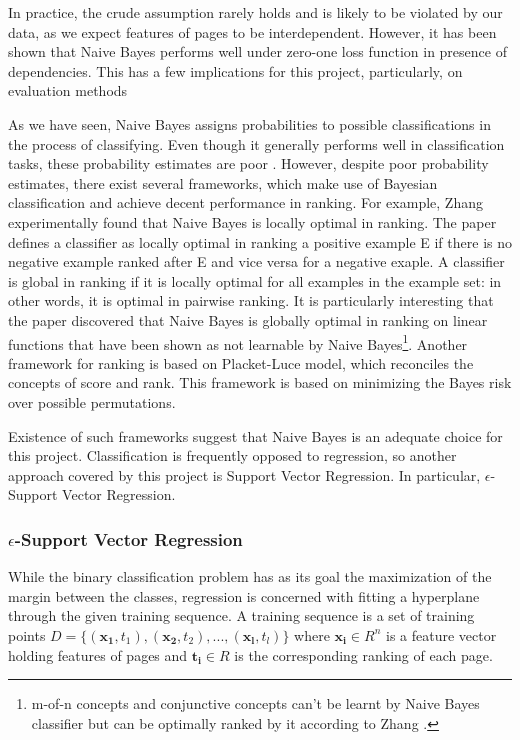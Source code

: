 \documentclass[12pt,twoside,notitlepage]{report}
\begin{document}
In practice, the crude assumption rarely  holds and is likely to
be violated by our data, as we expect features of pages to be interdependent.
However, it has been shown that Naive Bayes performs well under zero-one loss
function in presence of dependencies\cite{OPTIM}. This has a few
implications for this project, particularly, on evaluation methods 

As we have seen, Naive Bayes assigns probabilities to possible classifications
in the process of classifying. Even though it generally performs well in
classification tasks, these probability estimates are poor \cite{domingos96}.
However, despite poor probability estimates, there exist several frameworks,
which make use of Bayesian classification and achieve decent performance in
ranking. For example, Zhang \cite{zhang04} experimentally found that Naive
Bayes is locally optimal in ranking. The paper defines a classifier as locally
optimal in ranking a positive example E if there is no negative example ranked
after E and vice versa for a negative exaple. A classifier is global in ranking
if it is locally optimal for all examples in the example set: in other words,
it is optimal in pairwise ranking.  It is particularly interesting that the
paper discovered that Naive Bayes is globally optimal in ranking on linear
functions that have been shown as not learnable by Naive Bayes\footnote{m-of-n
concepts and conjunctive concepts can't be learnt by Naive Bayes classifier but
can be optimally ranked by it according to Zhang \cite{zhang04}.}.
Another framework for ranking \cite{bayesrank} is based on Placket-Luce model, which reconciles
the concepts of score and rank. This framework is based on minimizing the Bayes
risk over possible permutations.

Existence of such frameworks suggest that Naive Bayes is an adequate choice
for this project. Classification is frequently opposed to regression, so
another approach covered by this project is Support Vector Regression. In
particular, \(\epsilon\)-Support Vector Regression.

\subsubsection*{\(\epsilon\)-Support Vector Regression}
While the binary classification problem has as its goal the maximization of the
margin between the classes, regression is concerned with fitting a hyperplane
through the given training sequence.  A training sequence is a set of training
points \(D = \{ (\mathbf{x_1},t_1), (\mathbf{x_2},t_2), ... ,
(\mathbf{x_l},t_l) \}\) where \( \mathbf{x_i} \in R^n \) is a feature vector
holding features of pages and \( \mathbf{t_i} \in R \) is the corresponding
ranking of each page.
\end{document}
